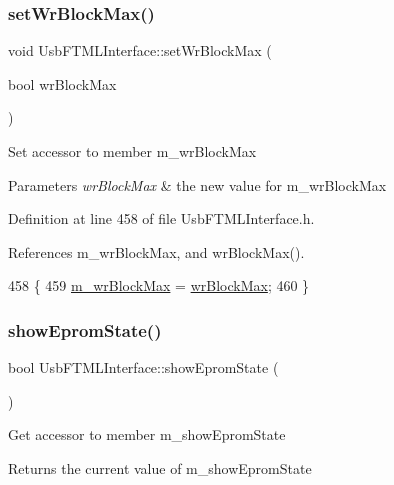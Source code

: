 \subsubsection{\texorpdfstring{set\+Wr\+Block\+Max()}{setWrBlockMax()}}
{\footnotesize\ttfamily void Usb\+F\+T\+M\+L\+Interface\+::set\+Wr\+Block\+Max (\begin{DoxyParamCaption}\item[{bool}]{wr\+Block\+Max }\end{DoxyParamCaption})\hspace{0.3cm}{\ttfamily [inline]}}

Set accessor to member m\+\_\+wr\+Block\+Max 
\begin{DoxyParams}{Parameters}
{\em wr\+Block\+Max} & the new value for m\+\_\+wr\+Block\+Max \\
\hline
\end{DoxyParams}


Definition at line 458 of file Usb\+F\+T\+M\+L\+Interface.\+h.



References m\+\_\+wr\+Block\+Max, and wr\+Block\+Max().


\begin{DoxyCode}
458                                        \{
459     \hyperlink{classUsbFTMLInterface_adb3d6b099e8283d80360f78fab064285}{m\_wrBlockMax} = \hyperlink{classUsbFTMLInterface_a296da37a9d4c2d78338800ebc283bb80}{wrBlockMax};
460   \}
\end{DoxyCode}
\mbox{\label{classUsbFTMLInterface_aa62fc0edc39360eeb473fe9e91df9044}} 
\subsubsection{\texorpdfstring{show\+Eprom\+State()}{showEpromState()}}
{\footnotesize\ttfamily bool Usb\+F\+T\+M\+L\+Interface\+::show\+Eprom\+State (\begin{DoxyParamCaption}{ }\end{DoxyParamCaption})\hspace{0.3cm}{\ttfamily [inline]}}

Get accessor to member m\+\_\+show\+Eprom\+State \begin{DoxyReturn}{Returns}
the current value of m\+\_\+show\+Eprom\+State 
\end{DoxyReturn}


